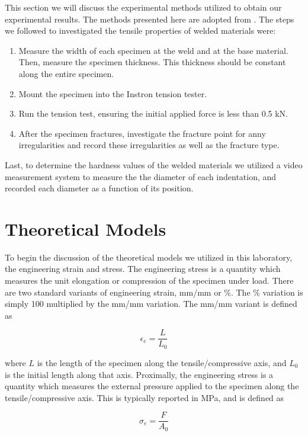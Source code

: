 \documentclass{article}
\begin{document}
This section we will discuss the experimental methods utilized to obtain our experimental results. The methods presented here are adopted from \cite{manual}. The steps we followed to investigated the tensile properties of welded materials were:
\begin{enumerate}
    \item Measure the width of each specimen at the weld and at the base material. Then, measure the specimen thickness. This thickness should be constant along the entire specimen. 
    \item Mount the specimen into the Instron tension tester. 
    \item Run the tension test, ensuring the initial applied force is less than 0.5 kN.
    \item After the specimen fractures, investigate the fracture point for anny irregularities and record these irregularities as well as the fracture type. 
\end{enumerate}

Last, to determine the hardness values of the welded materials we utilized a video measurement system to measure the the diameter of each indentation, and recorded each diameter as a function of its position.

\newpage
\section{Theoretical Models}
To begin the discussion of the theoretical models we utilized in this laboratory, the engineering strain and stress. The engineering stress is a quantity which measures the unit elongation or compression of the specimen under load. There are two standard variants of engineering strain, mm/mm or \%. The \% variation is simply 100 multiplied by the  mm/mm variation. The mm/mm variant is defined as

\begin{equation}
    \epsilon_e = \frac{L}{L_0}
\end{equation}

where $L$ is the length of the specimen along the tensile/compressive  axis, and $L_0$ is the initial length along that axis. Proximally, the engineering stress is a quantity which measures the external pressure applied to the specimen along the tensile/compressive axis. This is typically reported in MPa, and is defined as

\begin{equation}
    \sigma_{e} = \frac{F}{A_{0}}
\end{equation}
\end{document}
